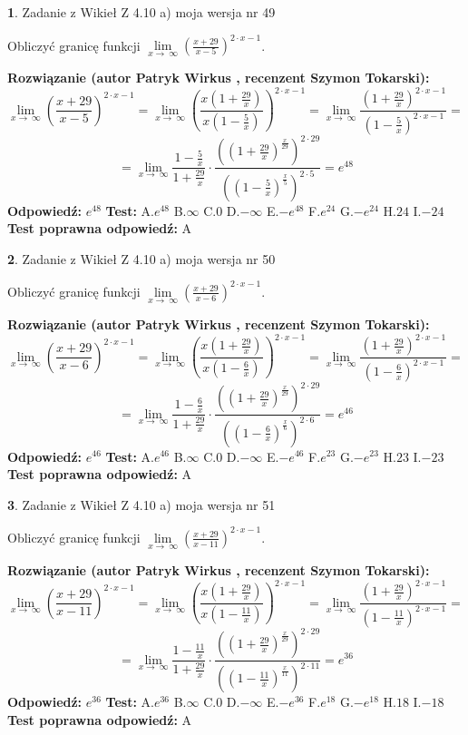 \documentclass[12pt, a4paper]{article}
\theoremstyle{definition} %
\newtheorem{zad}{}
\newcommand{\zadStart}[1]{\begin{zad}#1\newline}
\newcommand{\zadStop}{\end{zad}}
\newcommand{\rozwStart}[2]{\noindent \textbf{Rozwiązanie (autor #1 , recenzent #2): }\newline}
\newcommand{\rozwStop}{\newline}
\newcommand{\odpStart}{\noindent \textbf{Odpowiedź:}\newline}
\newcommand{\odpStop}{\newline}
\newcommand{\testStart}{\noindent \textbf{Test:}\newline}
\newcommand{\testStop}{\newline}
\newcommand{\kluczStart}{\noindent \textbf{Test poprawna odpowiedź:}\newline}
\newcommand{\kluczStop}{\newline}
\begin{document}
\zadStart{Zadanie z Wikieł Z 4.10 a) moja wersja nr 49}

Obliczyć granicę funkcji  $\lim\limits_{x\to\ \infty}(\frac{x+29}{x-5})^{2\cdot x-1}$.
\zadStop
\rozwStart{Patryk Wirkus}{Szymon Tokarski}
$$\lim\limits_{x\to\ \infty}(\frac{x+29}{x-5})^{2\cdot x-1} = \lim\limits_{x\to\ \infty}(\frac{x(1+\frac{29}{x})}{x(1-\frac{5}{x})})^{2\cdot x-1}=\lim\limits_{x\to\ \infty}\frac{(1+\frac{29}{x})^{2\cdot x-1}}{(1-\frac{5}{x})^{2\cdot x-1}}=$$
$$=\lim\limits_{x\to\ \infty}\frac{1-\frac{5}{x}}{1+\frac{29}{x}}\cdot\frac{((1+\frac{29}{x})^{\frac{x}{29}})^{2\cdot29}}{((1-\frac{5}{x})^{\frac{x}{5}})^{2\cdot5}}=e^{48}$$
\rozwStop
\odpStart
$e^{48}$
\odpStop
\testStart
A.$e^{48}$ B.$\infty$ C.$0$ D.$-\infty$ E.$-e^{48}$
F.$e^{24}$ G.$-e^{24}$
H.$24$
I.$-24$
\testStop
\kluczStart
A
\kluczStop



\zadStart{Zadanie z Wikieł Z 4.10 a) moja wersja nr 50}

Obliczyć granicę funkcji  $\lim\limits_{x\to\ \infty}(\frac{x+29}{x-6})^{2\cdot x-1}$.
\zadStop
\rozwStart{Patryk Wirkus}{Szymon Tokarski}
$$\lim\limits_{x\to\ \infty}(\frac{x+29}{x-6})^{2\cdot x-1} = \lim\limits_{x\to\ \infty}(\frac{x(1+\frac{29}{x})}{x(1-\frac{6}{x})})^{2\cdot x-1}=\lim\limits_{x\to\ \infty}\frac{(1+\frac{29}{x})^{2\cdot x-1}}{(1-\frac{6}{x})^{2\cdot x-1}}=$$
$$=\lim\limits_{x\to\ \infty}\frac{1-\frac{6}{x}}{1+\frac{29}{x}}\cdot\frac{((1+\frac{29}{x})^{\frac{x}{29}})^{2\cdot29}}{((1-\frac{6}{x})^{\frac{x}{6}})^{2\cdot6}}=e^{46}$$
\rozwStop
\odpStart
$e^{46}$
\odpStop
\testStart
A.$e^{46}$ B.$\infty$ C.$0$ D.$-\infty$ E.$-e^{46}$
F.$e^{23}$ G.$-e^{23}$
H.$23$
I.$-23$
\testStop
\kluczStart
A
\kluczStop



\zadStart{Zadanie z Wikieł Z 4.10 a) moja wersja nr 51}

Obliczyć granicę funkcji  $\lim\limits_{x\to\ \infty}(\frac{x+29}{x-11})^{2\cdot x-1}$.
\zadStop
\rozwStart{Patryk Wirkus}{Szymon Tokarski}
$$\lim\limits_{x\to\ \infty}(\frac{x+29}{x-11})^{2\cdot x-1} = \lim\limits_{x\to\ \infty}(\frac{x(1+\frac{29}{x})}{x(1-\frac{11}{x})})^{2\cdot x-1}=\lim\limits_{x\to\ \infty}\frac{(1+\frac{29}{x})^{2\cdot x-1}}{(1-\frac{11}{x})^{2\cdot x-1}}=$$
$$=\lim\limits_{x\to\ \infty}\frac{1-\frac{11}{x}}{1+\frac{29}{x}}\cdot\frac{((1+\frac{29}{x})^{\frac{x}{29}})^{2\cdot29}}{((1-\frac{11}{x})^{\frac{x}{11}})^{2\cdot11}}=e^{36}$$
\rozwStop
\odpStart
$e^{36}$
\odpStop
\testStart
A.$e^{36}$ B.$\infty$ C.$0$ D.$-\infty$ E.$-e^{36}$
F.$e^{18}$ G.$-e^{18}$
H.$18$
I.$-18$
\testStop
\kluczStart
A
\kluczStop
\end{document}
